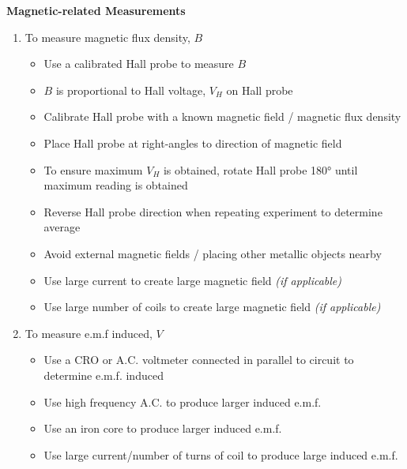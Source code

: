 \documentclass{article}
\begin{document}
\begin{flushleft}
\textbf{Magnetic-related Measurements}
\end{flushleft}
\begin{enumerate}
    \item To measure magnetic flux density, $B$
    \begin{itemize}
        \item Use a calibrated Hall probe to measure $B$
        \item $B$ is proportional to Hall voltage, $V_H$ on Hall probe
        \item  Calibrate Hall probe with a known magnetic field / magnetic flux density
        \item  Place Hall probe at right-angles to direction of magnetic field
        \item To ensure maximum $V_H$ is obtained, rotate Hall probe 180° until maximum reading is
obtained
        \item  Reverse Hall probe direction when repeating experiment to determine average
        \item Avoid external magnetic fields / placing other metallic objects nearby
        \item Use large current to create large magnetic field \textit{(if applicable)}
        \item Use large number of coils to create large magnetic field \textit{(if applicable)}
    \end{itemize}
    
    \item To measure e.m.f induced, $V$
    \begin{itemize}
        \item Use a CRO or A.C. voltmeter connected in parallel to circuit to determine e.m.f.
induced
        \item  Use high frequency A.C. to produce larger induced e.m.f.
        \item Use an iron core to produce larger induced e.m.f.     \item Use large current/number of turns of coil to produce large induced e.m.f.
    \end{itemize} 
    
\end{enumerate}
\end{document}
